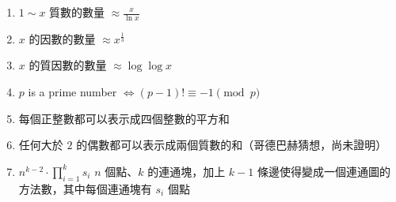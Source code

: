 \begin{enumerate}
    \item $1 \sim x$ 質數的數量 $\approx \frac{x}{\ln x}$
    \item $x$ 的因數的數量 $\approx x^\frac{1}{3}$
    \item $x$ 的質因數的數量 $\approx \log{\log{x}}$
    \item $p$ is a prime number $\Leftrightarrow (p-1)! \equiv -1  \pmod{p}$
    \item 每個正整數都可以表示成四個整數的平方和
    \item 任何大於 $2$ 的偶數都可以表示成兩個質數的和（哥德巴赫猜想，尚未證明）
    \item $n^{k-2} \cdot \prod_{i=1}^{k} s_i$ $n$ 個點、$k$ 的連通塊，加上 $k-1$ 條邊使得變成一個連通圖的方法數，其中每個連通塊有 $s_i$ 個點
\end{enumerate}
